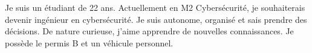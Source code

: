 
\begin{cvparagraph}
Je suis un étudiant de 22 ans. Actuellement en M2 Cybersécurité, je souhaiterais devenir ingénieur en
cybersécurité. Je suis autonome, organisé et sais prendre des décisions. De nature curieuse, j'aime apprendre de nouvelles connaissances. Je possède le permis B et un véhicule personnel.
\end{cvparagraph}
